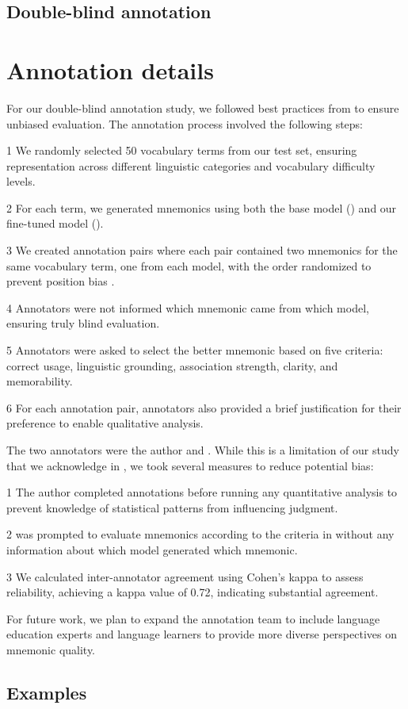 \subsection{Double-blind annotation}
\section{Annotation details} \label{app:annotation}

For our double-blind annotation study, we followed best practices from \citet{tsengBestPracticesManaging2020} to ensure unbiased evaluation. The annotation process involved the following steps:

\numlist{1} We randomly selected 50 vocabulary terms from our test set, ensuring representation across different linguistic categories and vocabulary difficulty levels.

\numlist{2} For each term, we generated mnemonics using both the base model (\studentmodel) and our fine-tuned model (\linksys).

\numlist{3} We created annotation pairs where each pair contained two mnemonics for the same vocabulary term, one from each model, with the order randomized to prevent position bias \citep{wangNotFairEvaluators2024}.

\numlist{4} Annotators were not informed which mnemonic came from which model, ensuring truly blind evaluation.

\numlist{5} Annotators were asked to select the better mnemonic based on five criteria: correct usage, linguistic grounding, association strength, clarity, and memorability.

\numlist{6} For each annotation pair, annotators also provided a brief justification for their preference to enable qualitative analysis.

The two annotators were the author and \judgemodel. While this is a limitation of our study that we acknowledge in , we took several measures to reduce potential bias:

\numlist{1} The author completed annotations before running any quantitative analysis to prevent knowledge of statistical patterns from influencing judgment.

\numlist{2} \judgemodel was prompted to evaluate mnemonics according to the criteria in  without any information about which model generated which mnemonic.

\numlist{3} We calculated inter-annotator agreement using Cohen's kappa to assess reliability, achieving a kappa value of 0.72, indicating substantial agreement.

For future work, we plan to expand the annotation team to include language education experts and language learners to provide more diverse perspectives on mnemonic quality.

\subsection{Examples}
